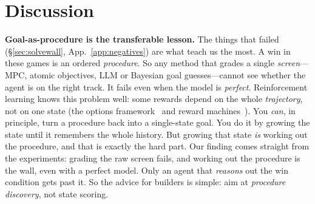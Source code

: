 \documentclass[11pt]{article}
\begin{document}
\section{Discussion}
\label{sec:discussion}
\textbf{Goal-as-procedure is the transferable lesson.} The things that failed (\S\ref{sec:solvewall},
App.~\ref{app:negatives}) are what teach us the most. A win in these games is an ordered
\emph{procedure}. So any method that grades a single \emph{screen}---MPC, atomic objectives, LLM or
Bayesian goal guesses---cannot see whether the agent is on the right track. It fails even when the
model is \emph{perfect}. Reinforcement learning knows this problem well: some rewards depend on the
whole \emph{trajectory}, not on one state (the options framework~\cite{sutton1999options} and reward
machines~\cite{icarte2018reward}). You \emph{can}, in principle, turn a procedure back into a
single-state goal. You do it by growing the state until it remembers the whole history. But growing
that state \emph{is} working out the procedure, and that is exactly the hard part. Our finding comes
straight from the experiments: grading the raw screen fails, and working out the procedure is the wall,
even with a perfect model. Only an agent that \emph{reasons} out the win condition gets past it. So the
advice for builders is simple: aim at \emph{procedure discovery}, not state scoring.
\end{document}
